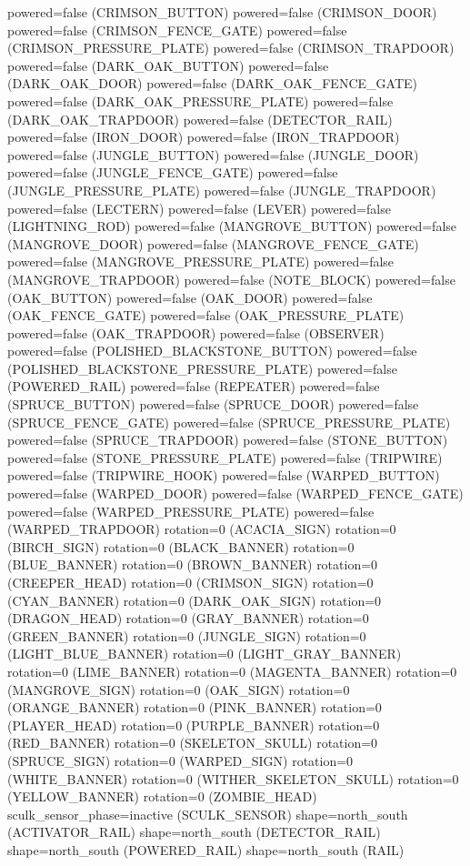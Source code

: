 \documentclass[11pt]{article}
\begin{document}
powered=false (CRIMSON_BUTTON)
powered=false (CRIMSON_DOOR)
powered=false (CRIMSON_FENCE_GATE)
powered=false (CRIMSON_PRESSURE_PLATE)
powered=false (CRIMSON_TRAPDOOR)
powered=false (DARK_OAK_BUTTON)
powered=false (DARK_OAK_DOOR)
powered=false (DARK_OAK_FENCE_GATE)
powered=false (DARK_OAK_PRESSURE_PLATE)
powered=false (DARK_OAK_TRAPDOOR)
powered=false (DETECTOR_RAIL)
powered=false (IRON_DOOR)
powered=false (IRON_TRAPDOOR)
powered=false (JUNGLE_BUTTON)
powered=false (JUNGLE_DOOR)
powered=false (JUNGLE_FENCE_GATE)
powered=false (JUNGLE_PRESSURE_PLATE)
powered=false (JUNGLE_TRAPDOOR)
powered=false (LECTERN)
powered=false (LEVER)
powered=false (LIGHTNING_ROD)
powered=false (MANGROVE_BUTTON)
powered=false (MANGROVE_DOOR)
powered=false (MANGROVE_FENCE_GATE)
powered=false (MANGROVE_PRESSURE_PLATE)
powered=false (MANGROVE_TRAPDOOR)
powered=false (NOTE_BLOCK)
powered=false (OAK_BUTTON)
powered=false (OAK_DOOR)
powered=false (OAK_FENCE_GATE)
powered=false (OAK_PRESSURE_PLATE)
powered=false (OAK_TRAPDOOR)
powered=false (OBSERVER)
powered=false (POLISHED_BLACKSTONE_BUTTON)
powered=false (POLISHED_BLACKSTONE_PRESSURE_PLATE)
powered=false (POWERED_RAIL)
powered=false (REPEATER)
powered=false (SPRUCE_BUTTON)
powered=false (SPRUCE_DOOR)
powered=false (SPRUCE_FENCE_GATE)
powered=false (SPRUCE_PRESSURE_PLATE)
powered=false (SPRUCE_TRAPDOOR)
powered=false (STONE_BUTTON)
powered=false (STONE_PRESSURE_PLATE)
powered=false (TRIPWIRE)
powered=false (TRIPWIRE_HOOK)
powered=false (WARPED_BUTTON)
powered=false (WARPED_DOOR)
powered=false (WARPED_FENCE_GATE)
powered=false (WARPED_PRESSURE_PLATE)
powered=false (WARPED_TRAPDOOR)
rotation=0 (ACACIA_SIGN)
rotation=0 (BIRCH_SIGN)
rotation=0 (BLACK_BANNER)
rotation=0 (BLUE_BANNER)
rotation=0 (BROWN_BANNER)
rotation=0 (CREEPER_HEAD)
rotation=0 (CRIMSON_SIGN)
rotation=0 (CYAN_BANNER)
rotation=0 (DARK_OAK_SIGN)
rotation=0 (DRAGON_HEAD)
rotation=0 (GRAY_BANNER)
rotation=0 (GREEN_BANNER)
rotation=0 (JUNGLE_SIGN)
rotation=0 (LIGHT_BLUE_BANNER)
rotation=0 (LIGHT_GRAY_BANNER)
rotation=0 (LIME_BANNER)
rotation=0 (MAGENTA_BANNER)
rotation=0 (MANGROVE_SIGN)
rotation=0 (OAK_SIGN)
rotation=0 (ORANGE_BANNER)
rotation=0 (PINK_BANNER)
rotation=0 (PLAYER_HEAD)
rotation=0 (PURPLE_BANNER)
rotation=0 (RED_BANNER)
rotation=0 (SKELETON_SKULL)
rotation=0 (SPRUCE_SIGN)
rotation=0 (WARPED_SIGN)
rotation=0 (WHITE_BANNER)
rotation=0 (WITHER_SKELETON_SKULL)
rotation=0 (YELLOW_BANNER)
rotation=0 (ZOMBIE_HEAD)
sculk_sensor_phase=inactive (SCULK_SENSOR)
shape=north_south (ACTIVATOR_RAIL)
shape=north_south (DETECTOR_RAIL)
shape=north_south (POWERED_RAIL)
shape=north_south (RAIL)
\end{document}
